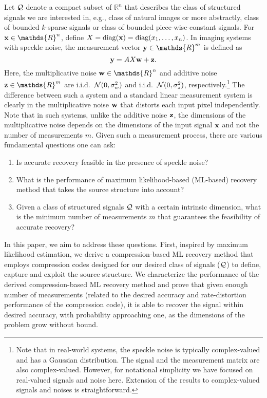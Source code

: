 \documentclass[onecolumn]{IEEEtran}
\newcommand{\wv}{{\bf w}}
\begin{document}
Let ${\cal Q}$ denote a compact subset of $\mathds{R}^n$ that describes the class of structured signals we are interested in, e.g., class of natural images or more abstractly, class of bounded $k$-sparse signals   or class of bounded piece-wise-constant signals. For $\xv\in\mathds{R}^n$, define  $X=\mathop{\rm diag}\nolimits({\bf x})=\mathop{\rm diag}\nolimits(x_1,\ldots,x_n)$. In imaging systems with  speckle noise, the measurement vector $\yv\in\mathds{R}^m$ is defined as 
\[
\yv=AX\wv+\zv.
\]
Here, the multiplicative noise $\wv\in\mathds{R}^n$ and additive noise $\zv\in\mathds{R}^m$ are i.i.d.~$\mathcal{N}(0,\sigma_w^2)$ and i.i.d.~$\mathcal{N}(0,\sigma_z^2)$, respectively.\footnote{Note that in real-world systems, the speckle noise is typically  complex-valued and has a Gaussian distribution. The signal and the measurement matrix are also complex-valued. However, for notational simplicity we have focused on real-valued signals and noise here. Extension of the results to complex-valued signals and noises is straightforward. } The difference between such a system and a standard linear measurement system is clearly in the multiplicative noise $\wv$ that distorts each input pixel independently. Note that in such  systems, unlike the additive noise ${\bf z}$, the dimensions of the multiplicative noise depends on the dimensions of the input signal ${\bf x}$ and not  the number of measurements $m$. Given such a measurement process, there are various fundamental  questions one can ask:
\begin{enumerate}
\item Is accurate recovery feasible in the presence of speckle noise?
\item What is the performance of maximum likelihood-based (ML-based) recovery method that takes the source structure into account?
\item Given a class of structured signals $\mathcal{Q}$ with a certain intrinsic dimension, what is the minimum number of measurements $m$ that guarantees the feasibility of accurate recovery?
\end{enumerate}
In this paper, we aim to address these questions. First, inspired by  maximum likelihood estimation, we derive a compression-based ML recovery method that employs  compression codes designed for our desired class of signals ($\mathcal{Q}$) to define, capture and exploit  the source structure. We characterize the performance of the derived compression-based ML recovery method and prove that given enough number of measurements (related to the desired accuracy and rate-distortion performance of the compression code), it is able to recover the signal within desired accuracy, with probability approaching one, as the dimensions of the problem grow without bound. 
\end{document}
